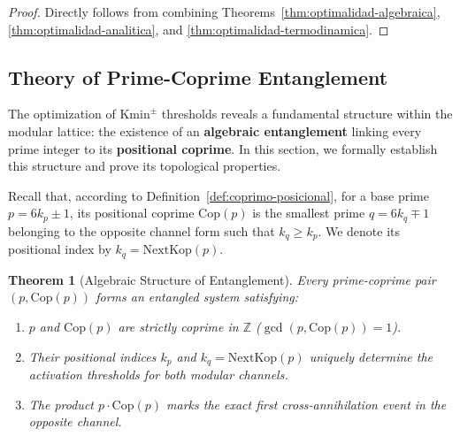 \documentclass{article}
\numberwithin{equation}{section}
\theoremstyle{plain}
\newtheorem{theorem}{Theorem}[section]
\theoremstyle{definition}
\begin{document}
\begin{proof}
Directly follows from combining Theorems~\ref{thm:optimalidad-algebraica}, \ref{thm:optimalidad-analitica}, and \ref{thm:optimalidad-termodinamica}.
\end{proof}


\subsection{Theory of Prime-Coprime Entanglement}
\label{sec:entrelazamiento}

The optimization of $\mathrm{Kmin}^\pm$ thresholds reveals a fundamental structure within the modular lattice: the existence of an \textbf{algebraic entanglement} linking every prime integer to its \textbf{positional coprime}. In this section, we formally establish this structure and prove its topological properties.

Recall that, according to Definition~\ref{def:coprimo-posicional}, for a base prime $p = 6k_p \pm 1$, its positional coprime $\mathrm{Cop}(p)$ is the smallest prime $q = 6k_q \mp 1$ belonging to the opposite channel form such that $k_q \ge k_p$. We denote its positional index by $k_q = \mathrm{NextKop}(p)$.

\begin{theorem}[Algebraic Structure of Entanglement]
\label{thm:estructura-entrelazamiento}
Every prime-coprime pair $(p, \mathrm{Cop}(p))$ forms an entangled system satisfying:
\begin{enumerate}
    \item $p$ and $\mathrm{Cop}(p)$ are strictly coprime in $\mathbb{Z}$ ($\gcd(p, \mathrm{Cop}(p)) = 1$).
    \item Their positional indices $k_p$ and $k_q = \mathrm{NextKop}(p)$ uniquely determine the activation thresholds for both modular channels.
    \item The product $p \cdot \mathrm{Cop}(p)$ marks the exact first cross-annihilation event in the opposite channel.
\end{enumerate}
\end{theorem}
\end{document}
